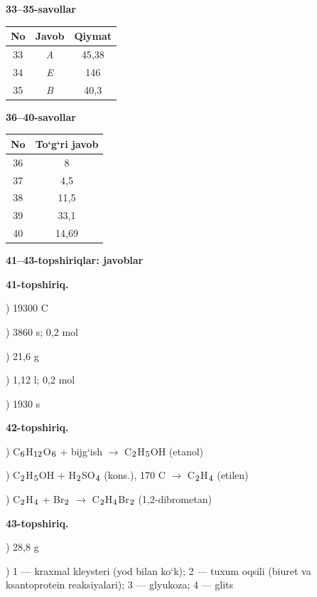 \documentclass[11pt,a4paper]{article}
\renewcommand{\textsubscript}[1]{\ensuremath{_{\text{\fontsize{8}{8}\selectfont #1}}}}
\begin{document}
\noindent\textbf{33--35-savollar}\par\smallskip
\noindent\begin{tabular}{|c|c|c|}\hline \textbf{No} & \textbf{Javob} & \textbf{Qiymat}\\\hline
33 & \textsl{A} & 45,38\\\hline
34 & \textsl{E} & 146\\\hline
35 & \textsl{B} & 40,3\\\hline
\end{tabular}\par\medskip
\noindent\textbf{36--40-savollar}\par\smallskip
\noindent\begin{tabular}{|c|c|}\hline \textbf{No} & \textbf{To`g`ri javob}\\\hline
36 & 8\\\hline
37 & 4,5\\\hline
38 & 11,5\\\hline
39 & 33,1\\\hline
40 & 14,69\\\hline
\end{tabular}\par\medskip
\noindent\textbf{41--43-topshiriqlar: javoblar}\par\smallskip
\noindent\textbf{41-topshiriq.}\par
{}) 19300 C\par
{}) 3860 s; 0,2 mol\par
{}) 21,6 g\par
{}) 1,12 l; 0,2 mol\par
{}) 1930 s\par
\noindent\textbf{42-topshiriq.}\par
{}) C\textsubscript{6}H\textsubscript{12}O\textsubscript{6} + bijg`ish $\to$ C\textsubscript{2}H\textsubscript{5}OH (etanol)\par
{}) C\textsubscript{2}H\textsubscript{5}OH + H\textsubscript{2}SO\textsubscript{4} (kons.), 170 \textdegree{}C $\to$ C\textsubscript{2}H\textsubscript{4} (etilen)\par
{}) C\textsubscript{2}H\textsubscript{4} + Br\textsubscript{2} $\to$ C\textsubscript{2}H\textsubscript{4}Br\textsubscript{2} (1,2-dibrometan)\par
\noindent\textbf{43-topshiriq.}\par
{}) 28,8 g\par
{}) 1 --- kraxmal kleysteri (yod bilan ko`k); 2 --- tuxum oqsili (biuret va ksantoprotein reaksiyalari); 3 --- glyukoza; 4 --- glits\par
\end{document}
